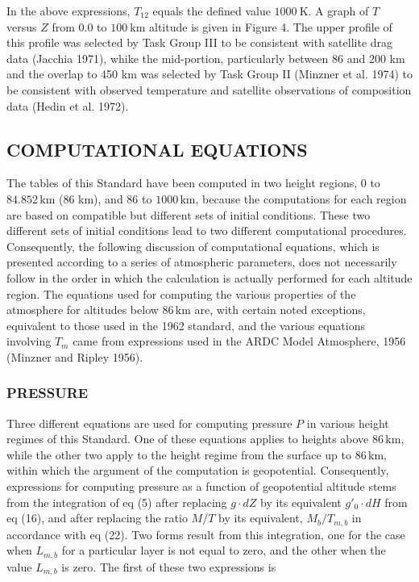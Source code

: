 \documentclass{article}
\begin{document}
In the above expressions, $T_{12}$ equals the defined value $1000~\text{K}$. A graph of $T$ versus $Z$ from $0.0$ to $100~\text{km}$ altitude is given in Figure 4. The upper profile of this profile was selected by Task Group III to be consistent with satellite drag data (Jacchia 1971), whike the mid-portion, particularly between 86 and 200 km and the overlap to 450 km was selected by Task Group II (Minzner et al. 1974) to be consistent with observed temperature and satellite observations of composition data (Hedin et al. 1972).

\subsection{COMPUTATIONAL EQUATIONS}

The tables of this Standard have been computed in two height regions, $0$ to $84.852 \, \text{km}$ (86 km), and $86$ to $1000 \, \text{km}$, because the computations for each region are based on compatible but different sets of initial conditions. These two different sets of initial conditions lead to two different computational procedures. Consequently, the following discussion of computational equations, which is presented according to a series of atmospheric parameters, does not necessarily follow in the order in which the calculation is actually performed for each altitude region. The equations used for computing the various properties of the atmosphere for altitudes below $86 \, \text{km}$ are, with certain noted exceptions, equivalent to those used in the 1962 standard, and the various equations involving $T_m$ came from expressions used in the ARDC Model Atmosphere, 1956 (Minzner and Ripley 1956).\\

\subsubsection{PRESSURE}

Three different equations are used for computing pressure $P$ in various height regimes of this Standard. One of these equations applies to heights above $86 \, \text{km}$, while the other two apply to the height regime from the surface up to $86 \, \text{km}$, within which the argument of the computation is geopotential. Consequently, expressions for computing pressure as a function of geopotential altitude stems from the integration of eq (5) after replacing $g \cdot dZ$ by its equivalent $g'_0 \cdot dH$ from eq (16), and after replacing the ratio $M/T$ by its equivalent, $M_b/T_{m,b}$ in accordance with eq (22). Two forms result from this integration, one for the case when $L_{m,b}$ for a particular layer is not equal to zero, and the other when the value $L_{m,b}$ is zero. The first of these two expressions is
\end{document}
